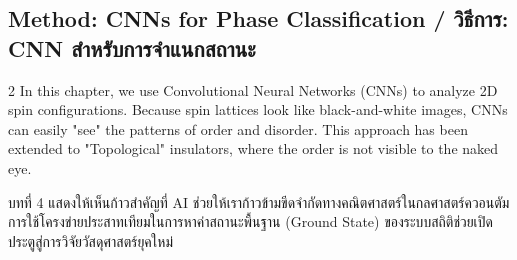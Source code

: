 \subsection{Method: CNNs for Phase Classification \quad / \quad \textthai{วิธีการ: CNN สำหรับการจำแนกสถานะ}}
\begin{paracol}{2}
In this chapter, we use Convolutional Neural Networks (CNNs) to analyze 2D spin configurations. Because spin lattices look like black-and-white images, CNNs can easily "see" the patterns of order and disorder. This approach has been extended to "Topological" insulators, where the order is not visible to the naked eye.

\switchcolumn

\begin{thai}
บทที่ 4 แสดงให้เห็นก้าวสำคัญที่ AI ช่วยให้เราก้าวข้ามขีดจำกัดทางคณิตศาสตร์ในกลศาสตร์ควอนตัม การใช้โครงข่ายประสาทเทียมในการหาค่าสถานะพื้นฐาน (Ground State) ของระบบสถิติช่วยเปิดประตูสู่การวิจัยวัสดุศาสตร์ยุคใหม่
\end{thai}
\end{paracol}
